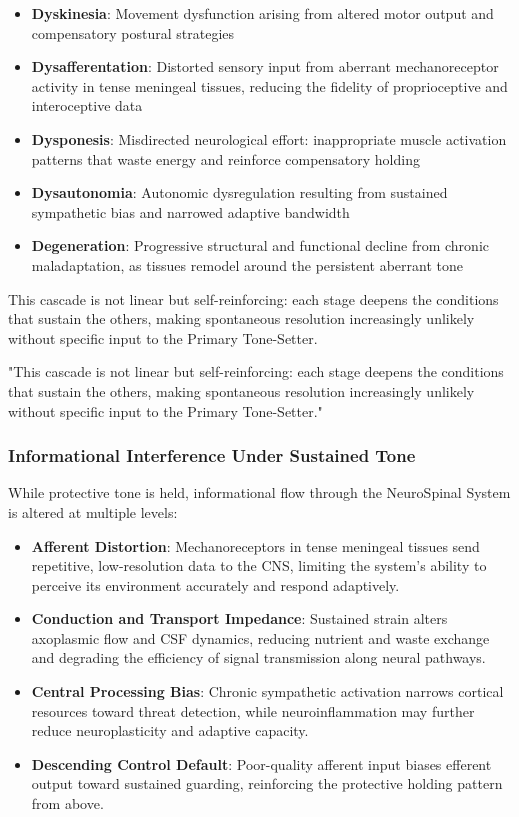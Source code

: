 \documentclass[11pt,letterpaper]{article}
\begin{document}
\begin{itemize}
\item \textbf{Dyskinesia}: Movement dysfunction arising from altered motor output and compensatory postural strategies
\item \textbf{Dysafferentation}: Distorted sensory input from aberrant mechanoreceptor activity in tense meningeal tissues, reducing the fidelity of proprioceptive and interoceptive data
\item \textbf{Dysponesis}: Misdirected neurological effort: inappropriate muscle activation patterns that waste energy and reinforce compensatory holding
\item \textbf{Dysautonomia}: Autonomic dysregulation resulting from sustained sympathetic bias and narrowed adaptive bandwidth
\item \textbf{Degeneration}: Progressive structural and functional decline from chronic maladaptation, as tissues remodel around the persistent aberrant tone
\end{itemize}

This cascade is not linear but self-reinforcing: each stage deepens the conditions that sustain the others, making spontaneous resolution increasingly unlikely without specific input to the Primary Tone-Setter.


\begin{pullquotebox}
"This cascade is not linear but self-reinforcing: each stage deepens the conditions that sustain the others, making spontaneous resolution increasingly unlikely without specific input to the Primary Tone-Setter."
\end{pullquotebox}


\subsubsection{Informational Interference Under Sustained Tone}

While protective tone is held, informational flow through the NeuroSpinal System is altered at multiple levels:


\begin{itemize}
\item \textbf{Afferent Distortion}: Mechanoreceptors in tense meningeal tissues send repetitive, low-resolution data to the CNS, limiting the system's ability to perceive its environment accurately and respond adaptively.
\item \textbf{Conduction and Transport Impedance}: Sustained strain alters axoplasmic flow and CSF dynamics, reducing nutrient and waste exchange and degrading the efficiency of signal transmission along neural pathways.
\item \textbf{Central Processing Bias}: Chronic sympathetic activation narrows cortical resources toward threat detection, while neuroinflammation may further reduce neuroplasticity and adaptive capacity.
\item \textbf{Descending Control Default}: Poor-quality afferent input biases efferent output toward sustained guarding, reinforcing the protective holding pattern from above.
\end{itemize}
\end{document}
